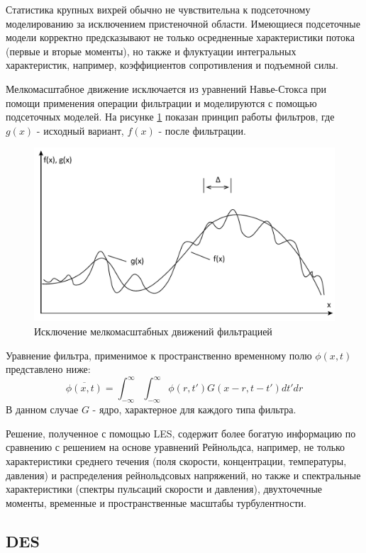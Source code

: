 	Статистика крупных вихрей обычно не чувствительна к подсеточному моделированию за исключением пристеночной области. Имеющиеся подсеточные модели корректно предсказывают не только осредненные характеристики потока (первые и вторые моменты), но также и флуктуации интегральных характеристик, например, коэффициентов сопротивления и подъемной силы\cite{Fureby2000}.
	
	Мелкомасштабное движение исключается из уравнений Навье-Стокса при помощи применения операции фильтрации и моделируются с помощью подсеточных моделей. На рисунке \ref{fig:lesfilter} показан принцип работы фильтров, где $g(x)$ - исходный вариант, $f(x)$ - после фильтрации.\\
	\begin{figure}[H]
		\centering
		\includegraphics[width=0.7\linewidth]{../Assets/ФильтрацияLES}
		\caption{Исключение мелкомасштабных движений фильтрацией}
		\label{fig:lesfilter}
	\end{figure}
	
	Уравнение фильтра, применимое к пространственно временному полю $\phi(x,t)$ представлено ниже:
	\begin{equation}
		\overline{\phi(x,t)} = \int_{-\infty}^{\infty}\int_{-\infty}^{\infty}\phi(r,t')G(x - r, t - t')dt'dr
	\end{equation}
	В данном случае $G$ - ядро, характерное для каждого типа фильтра.
	
	Решение, полученное с помощью LES, содержит более богатую информацию по сравнению с решением на основе уравнений Рейнольдса, например, не только характеристики среднего течения (поля скорости, концентрации, температуры, давления) и распределения рейнольдсовых напряжений, но также и спектральные характеристики (спектры пульсаций скорости и давления), двухточечные моменты, временные и пространственные масштабы турбулентности.

\subsection{DES}
	
